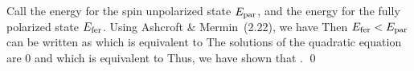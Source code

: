 {	Call the energy for the spin unpolarized state $E_\text{par}$, and the energy for the fully polarized state $E_\text{fer}$.  Using Ashcroft \& Mermin~(2.22),
	we have
	Then $E_\text{fer} < E_\text{par}$ can be written as
	which is equivalent to
	The solutions of the quadratic equation are 0 and
	which is equivalent to
	Thus, we have shown that \ans{$\rs / \aB > 5.45 \implies \Efer < \Epar$}. \qed
}